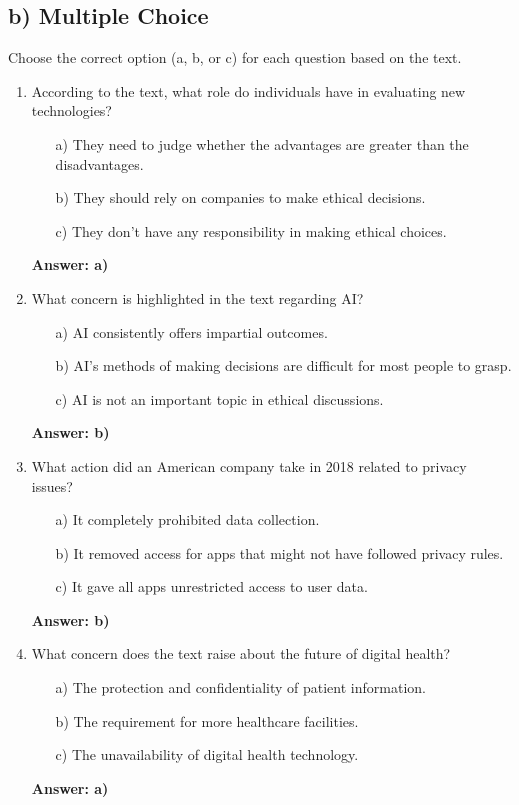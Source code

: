\documentclass[12pt]{article}
\begin{document}
\subsection*{b) Multiple Choice}

Choose the correct option (a, b, or c) for each question based on the text.

\begin{enumerate}[label=\textbf{01.}]
    \item According to the text, what role do individuals have in evaluating new technologies?
    \begin{itemize}
        \item[a)] They need to judge whether the advantages are greater than the disadvantages.
        \item[b)] They should rely on companies to make ethical decisions.
        \item[c)] They don’t have any responsibility in making ethical choices.
    \end{itemize}
    \textbf{Answer: a)} 
    
    \item What concern is highlighted in the text regarding AI?
    \begin{itemize}
        \item[a)] AI consistently offers impartial outcomes.
        \item[b)] AI’s methods of making decisions are difficult for most people to grasp.
        \item[c)] AI is not an important topic in ethical discussions.
    \end{itemize}
    \textbf{Answer: b)} 
    
    \item What action did an American company take in 2018 related to privacy issues?
    \begin{itemize}
        \item[a)] It completely prohibited data collection.
        \item[b)] It removed access for apps that might not have followed privacy rules.
        \item[c)] It gave all apps unrestricted access to user data.
    \end{itemize}
    \textbf{Answer: b)} 
    
    \item What concern does the text raise about the future of digital health?
    \begin{itemize}
        \item[a)] The protection and confidentiality of patient information.
        \item[b)] The requirement for more healthcare facilities.
        \item[c)] The unavailability of digital health technology.
    \end{itemize}
    \textbf{Answer: a)} 
    

\end{enumerate}
\end{document}
